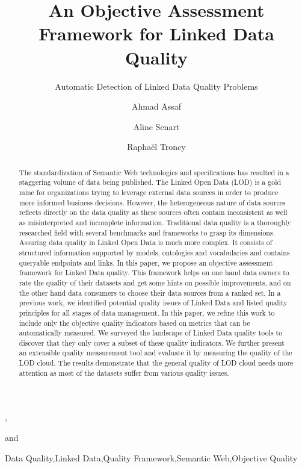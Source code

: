 \documentclass[onecolumn, crcready]{iosart2c}
\begin{document}
\begin{frontmatter}

\title{An Objective Assessment Framework for Linked Data Quality}
\subtitle{Automatic Detection of Linked Data Quality Problems}
\author[A,B]{Ahmad Assaf},\author[A]{Aline Senart} and
\author[B]{Rapha\"{e}l Troncy}
\address[A]{SAP Research, SAP Labs France SAS,\\
805 avenue du Dr. Maurice Donat, BP 1216, 06254 Mougins Cedex, France\\
}
\address[B]{EURECOM,\\
2229 route des cretes, 06560 Sophia Antipolis, France\\
}


\begin{abstract}
The standardization of Semantic Web technologies and specifications has resulted in a staggering volume of data being published. The Linked Open Data (LOD) is a gold mine for organizations trying to leverage external data sources in order to produce more informed business decisions. However, the heterogeneous nature of data sources reflects directly on the data quality as these sources often contain inconsistent as well as misinterpreted and incomplete information. Traditional data quality is a thoroughly researched field with several benchmarks and frameworks to grasp its dimensions. Assuring data quality in Linked Open Data is much more complex. It consists of structured information supported by models, ontologies and vocabularies and contains queryable endpoints and links. In this paper, we propose an objective assessment framework for Linked Data quality. This framework helps on one hand data owners to rate the quality of their datasets and get some hints on possible improvements, and on the other hand data consumers to choose their data sources from a ranked set. In a previous work, we identified potential quality issues of Linked Data and listed quality principles for all stages of data management. In this paper, we refine this work to include only the objective quality indicators based on metrics that can be automatically measured. We surveyed the landscape of Linked Data quality tools to discover that they only cover a subset of these quality indicators. We further present an extensible quality measurement tool and evaluate it by measuring the quality of the LOD cloud. The results demonstrate that the general quality of LOD cloud needs more attention as most of the datasets suffer from various quality issues.
\end{abstract}

\begin{keyword}
Data Quality\sep Linked Data\sep Quality Framework\sep Semantic Web\sep Objective Quality
\end{keyword}
\end{frontmatter}
\end{document}
